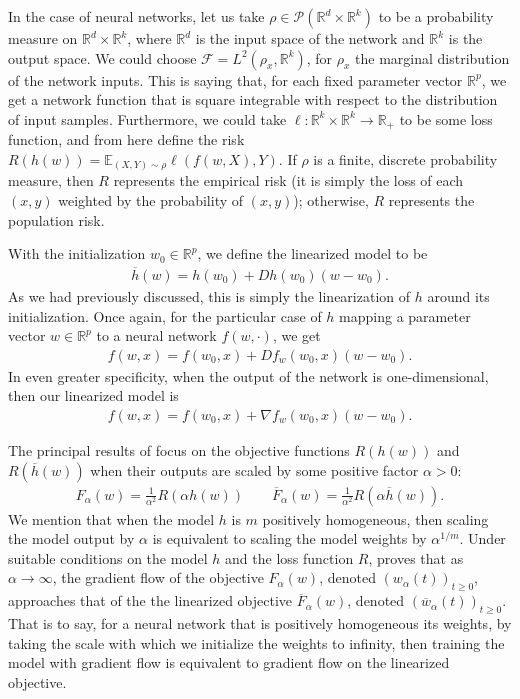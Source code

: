\documentclass{article}
\begin{document}
In the case of neural networks, let us take $\rho \in \mathcal{P}(\mathbb{R}^d \times \mathbb{R}^k)$ to be a probability measure on $\mathbb{R}^d \times \mathbb{R}^k$, where $\mathbb{R}^d$ is the input space of the network and $\mathbb{R}^k$ is the output space. We could choose $\mathcal{F} = L^2(\rho_x, \mathbb{R}^k)$, for $\rho_x$ the marginal distribution of the network inputs. This is saying that, for each fixed parameter vector $\mathbb{R}^p$, we get a network function that is square integrable with respect to the distribution of input samples. Furthermore, we could take $\ell: \mathbb{R}^k \times \mathbb{R}^k \rightarrow \mathbb{R}_+$ to be some loss function, and from here define the risk $R(h(w)) = \mathbb{E}_{(X, Y) \sim \rho}\ell(f(w, X), Y)$. If $\rho$ is a finite, discrete probability measure, then $R$ represents the empirical risk (it is simply the loss of each $(x, y)$ weighted by the probability of $(x, y)$); otherwise, $R$ represents the population risk.

With the initialization $w_0 \in \mathbb{R}^p$, we define the linearized model to be 
\begin{align*}
\overline{h}(w) = h(w_0) + Dh(w_0)(w - w_0).
\end{align*}
As we had previously discussed, this is simply the linearization of $h$ around its initialization. Once again, for the particular case of $h$ mapping a parameter vector $w \in \mathbb{R}^p$ to a neural network $f(w, \cdot)$, we get
\begin{align*}
    f(w, x) = f(w_0, x) + Df_w(w_0, x)(w - w_0). 
\end{align*}
In even greater specificity, when the output of the network is one-dimensional, then our linearized model is
\begin{align*}
    f(w, x) = f(w_0, x) + \nabla f_w(w_0, x)(w - w_0). 
\end{align*}

The principal results of \cite{chizat2018lazy} focus on the objective functions $R(h(w))$ and $R(\overline{h}(w))$ when their outputs are scaled by some positive factor $\alpha > 0$:
\begin{align*}
    F_{\alpha}(w) = \frac{1}{\alpha^2}R(\alpha h(w)) \qquad
    \overline{F}_{\alpha}(w) = \frac{1}{\alpha^2}R(\alpha \overline{h}(w)).
\end{align*}
We mention that when the model $h$ is $m$ positively homogeneous, then scaling the model output by $\alpha$ is equivalent to scaling the model weights by $\alpha^{1/m}$. Under suitable conditions on the model $h$ and the loss function $R$, \cite{chizat2018lazy} proves that as $\alpha \rightarrow \infty$, the gradient flow of the objective $F_{\alpha}(w)$, denoted $(w_{\alpha}(t))_{t \geq 0}$, approaches that of the the linearized objective $\overline{F}_{\alpha}(w)$, denoted $(\overline{w}_{\alpha}(t))_{t \geq 0}$. That is to say, for a neural network that is positively homogeneous its weights, by taking the scale with which we initialize the weights to infinity, then training the model with gradient flow is equivalent to gradient flow on the linearized objective.
\end{document}
